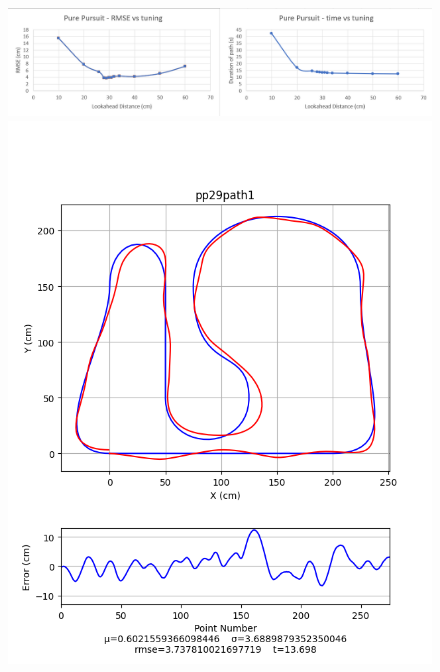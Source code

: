 \documentclass[mla8alt]{mla}
\begin{document}
\begin{paper}
\begin{figure}[H]
\includegraphics[width=\linewidth]{tuningGraphs/pp}
\includegraphics[width=\linewidth]{pathData/pppath1}
\endminipage\hfill
{}

\end{figure}
\end{paper}
\end{document}
